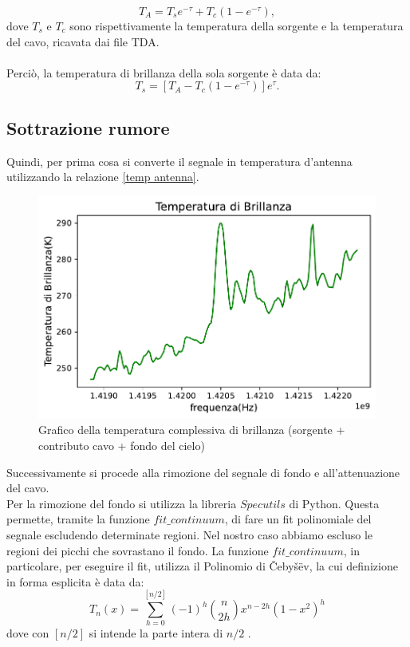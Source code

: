 \begin{equation}
    T_{A}=T_{s}e^{-\tau}+T_{c}(1-e^{-\tau}),
\end{equation}
dove $T_{s}$ e $T_{c}$ sono rispettivamente la temperatura della sorgente e la temperatura del cavo, ricavata dai file TDA. 
\\\\
Perciò, la temperatura di brillanza della sola sorgente è data da:
\begin{equation}
    T_{s}=[T_{A}-T_{c}(1-e^{-\tau})]e^{\tau}.
\label{temp cielo}
\end{equation}

\subsection{Sottrazione rumore}

Quindi, per prima cosa si converte il segnale in temperatura d'antenna utilizzando la relazione \eqref{temp antenna}.

\begin{figure}[H]
	\centering
	\includegraphics[scale=0.8]{Temperatura_brillanza_tutto.pdf}
	\caption{Grafico della temperatura complessiva di brillanza (sorgente + contributo cavo + fondo del cielo)}
    	\label{fig:Temperatura_brillanza_tutto}
\end{figure}

Successivamente si procede alla rimozione del segnale di fondo e all'attenuazione del cavo.\\
Per la rimozione del fondo si utilizza la libreria $Specutils$ di Python. Questa permette, tramite la funzione $fit\_continuum$, di fare un fit polinomiale del segnale escludendo determinate regioni. Nel nostro caso abbiamo escluso le regioni dei picchi che sovrastano il fondo. La funzione $fit\_continuum$, in particolare, per eseguire il fit, utilizza il Polinomio di Čebyšëv, la cui definizione in forma esplicita è data da:
\begin{equation}
    T_n(x)=\sum_{h=0}^{[n/2]} (-1)^h {n \choose 2h} x^{n-2h} (1-x^2)^h
\end{equation}
dove con $[n/2]$ si intende la parte intera di $n/2$ \cite{itwiki}.

